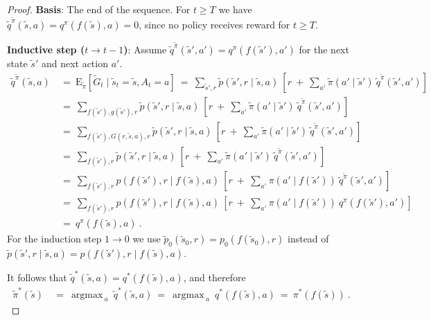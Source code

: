 \documentclass{article}
\newcommand\EXP{\mathbf{\mathrm{E}}}
\newcommand\argmax{\mathop{\mathrm{argmax}\,}}
\renewcommand{\geq}{\geqslant}
\begin{document}
\begin{appendices}
\begin{proof}
  {\bf Basis}: The end of the sequence.
  For $t\geq T$ we have
  $\tilde{q}^{\tilde{\pi}}(\tilde{s},a)=q^{\pi}(f(\tilde{s}),a)=0$, since
  no policy receives reward for $t\geq T$.
  
{\bf Inductive step ($t \to t-1$)}: Assume $\tilde{q}^{\tilde{\pi}}(\tilde{s}',a')=q^{\pi}(f(\tilde{s}'),a')$ for the next state $\tilde{s}'$ and next action $a'$.
\begin{align} \nonumber 
  \tilde{q}^{\tilde{\pi}}(\tilde{s},a) \ &= \ \EXP_{\tilde{\pi}} \left[
    \tilde{G}_t \mid  \tilde{s}_t=\tilde{s}, A_t=a \right]
  \ = \   \sum_{\tilde{s}',r} \tilde{p}(\tilde{s}',r\mid \tilde{s},a) \ 
  \left[r \ + \ \sum_{a'} \tilde{\pi}(a'\mid \tilde{s}')  \
    \tilde{q}^{\tilde{\pi}}(\tilde{s}',a')  \right] \\   
  &= \ \sum_{f(\tilde{s}'),g(\tilde{s}'),r} \tilde{p}(\tilde{s}',r\mid \tilde{s},a) \ 
  \left[r \ + \ \sum_{a'} \tilde{\pi}(a'\mid \tilde{s}')  \
    \tilde{q}^{\tilde{\pi}}(\tilde{s}',a')  \right] \\ \nonumber    
  &= \ \sum_{f(\tilde{s}'),G(r,\tilde{s},a),r} \tilde{p}(\tilde{s}',r\mid \tilde{s},a) \ 
  \left[r \ + \ \sum_{a'} \tilde{\pi}(a'\mid \tilde{s}')  \
    \tilde{q}^{\tilde{\pi}}(\tilde{s}',a')  \right] \\ \nonumber    
  &= \ \sum_{f(\tilde{s}'),r} \tilde{p}(\tilde{s}',r\mid \tilde{s},a) \ 
  \left[r \ + \ \sum_{a'} \tilde{\pi}(a'\mid \tilde{s}')  \
    \tilde{q}^{\tilde{\pi}}(\tilde{s}',a')  \right] \\ \nonumber    
  &= \ \sum_{f(\tilde{s}'),r} p(f(\tilde{s}'),r\mid f(\tilde{s}),a) \ 
  \left[r \ + \ \sum_{a'} \pi(a'\mid f(\tilde{s}'))  \
    \tilde{q}^{\tilde{\pi}}(\tilde{s}',a')  \right] \\ \nonumber    
  &= \ \sum_{f(\tilde{s}'),r} p(f(\tilde{s}'),r\mid f(\tilde{s}),a) \ 
  \left[r \ + \ \sum_{a'} \pi(a'\mid f(\tilde{s}'))  \
    q^{\pi}(f(\tilde{s}'),a')  \right] \\ \nonumber    
  &= \ q^{\pi}(f(\tilde{s}),a) \ .
\end{align}
For the induction step $1 \to 0$ we use
$\tilde{p}_0(\tilde{s}_0,r) =  p_0(f(\tilde{s}_0),r)$
instead of $\tilde{p}(\tilde{s}',r\mid \tilde{s},a) =  p(f(\tilde{s}') ,r \mid f(\tilde{s}),a)$.

It follows that
$\tilde{q}^*(\tilde{s},a)=q^*(f(\tilde{s}),a)$, and therefore
\begin{align}
\tilde{\pi}^{*}(\tilde{s}) \ &= \ \argmax_a \  \tilde{q}^*(\tilde{s},a)
\ = \ \argmax_a \ q^*(f(\tilde{s}),a) \ = \ \pi^{*}(f(\tilde{s})) \ .
\end{align}



\end{proof}
\end{appendices}
\end{document}
